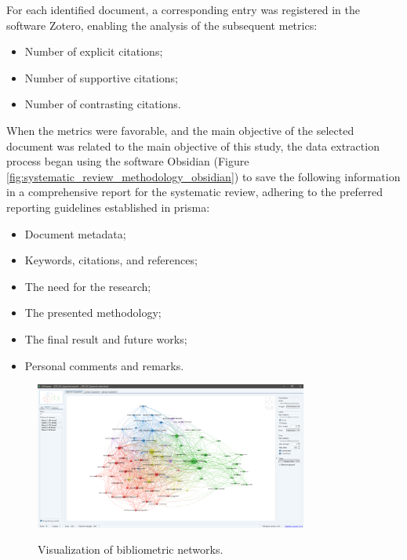 For each identified document, a corresponding entry was registered in the software Zotero, enabling the analysis of the subsequent metrics:
 \begin{itemize}
   \item Number of explicit citations;
   \item Number of supportive citations;
   \item Number of contrasting citations.
 \end{itemize}

When the metrics were favorable, and the main objective of the selected document was related to the main objective of this study, the data extraction process began using the software Obsidian (Figure \ref{fig:systematic_review_methodology_obsidian}) to save the following information in a comprehensive report for the systematic review, adhering to the preferred reporting guidelines established in \gls{prisma}:
\begin{itemize}
    \item Document metadata;
    \item Keywords, citations, and references;
    \item The need for the research;
    \item The presented methodology;
    \item The final result and future works;
    \item Personal comments and remarks.
\end{itemize}

\begin{figure}[htbp]
    \raggedright
        \caption{Visualization of bibliometric networks.}
        \includegraphics[width=0.80\textwidth]{resources/images/080-systematic_review/Review_VOSviewer_03_2023_01.png}
        \label{fig:systematic_review_methodology_bibliometric_networks}
\end{figure}

